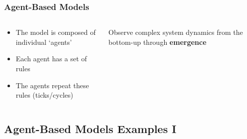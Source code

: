 \documentclass[compress]{beamer}
\begin{document}
    \begin{frame}[Basic2] \frametitle{Agent-Based Models}
        \begin{columns}
            \begin{column}{0.5\textwidth}
                \begin{itemize}
                    \item The model is composed of individual `agents'
                    \item Each agent has a set of rules
                    \item The agents repeat these rules (ticks/cycles)
                \end{itemize}
            \end{column}
            \begin{column}{0.5\textwidth}
                Observe complex system dynamics from the bottom-up through \textbf{emergence}
            \end{column}
        \end{columns}
    \end{frame}

\subsection{Agent-Based Models Examples I}
\end{document}
